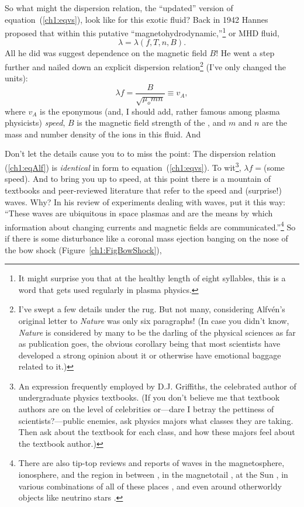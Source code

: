 So what might the dispersion relation, the ``updated'' version of
equation~(\ref{ch1:eqvs}), look like for this exotic fluid? Back in
1942 Hannes \Alf proposed that within this putative
``magnetohydrodynamic,''\footnote{It might surprise you that at the
  healthy length of eight syllables, this is a word that gets used
  regularly in plasma physics.} or MHD fluid,
\begin{equation}
  \label{ch1:eqmhd}
  \lambda = \lambda (f, T, n, B).
\end{equation}
All he did was suggest dependence on the magnetic field $B$! He went a
step further and nailed down an explicit dispersion
relation\footnote{I've swept a few details under the rug. But not
  many, considering Alfv\'{e}n's original letter to \textsl{Nature}
  was only six paragraphs! (In case you didn't know, \textsl{Nature}
  is considered by many to be the darling of the physical sciences as
  far as publication goes, the obvious corollary being that most
  scientists have developed a strong opinion about it or otherwise
  have emotional baggage related to it.)} (I've only changed the
units):
\begin{equation}
  \label{ch1:eqAlf}
  \lambda f = \frac{B}{\sqrt{\mu_o m n}} \equiv v_A,
\end{equation}
where $v_A$ is the eponymous (and, I should add, rather famous among
plasma physicists) \textsl{\Alf speed}, $B$ is the magnetic field
strength of the , and $m$ and $n$ are the mass and number density of
the ions in this fluid. And  

Don't let the details cause you to to miss the point: The dispersion
relation (\ref{ch1:eqAlf}) is \emph{identical} in form to
equation~(\ref{ch1:eqvs}). To wit\footnote{An expression frequently
  employed by D.J. Griffiths, the celebrated author of undergraduate
  physics textbooks. (If you don't believe me that textbook authors
  are on the level of celebrities or---dare I betray the pettiness of
  scientists?---public enemies, ask physics majors what classes they
  are taking. Then ask about the textbook for each class, and how
  these majors feel about the textbook author.)}, $ \lambda f = $(some
speed). And to bring you up to speed, at this point there is a
mountain of textbooks and peer-reviewed literature that refer to the
\Alf speed and (surprise!) \Alf waves. Why? In his review of
experiments dealing with \Alf waves, \cite{Gekelman1999} put it this
way: ``These waves are ubiquitous in space plasmas and are the means
by which information about changing currents and magnetic fields are
communicated.''\footnote{There are also tip-top reviews and reports of
  \Alf waves in the magnetosphere, ionosphere, and the region in
  between \citep{Stasiewicz2000,Berthomier2011,Mottez2015}, in the
  magnetotail \citep{Keiling2009}, at the Sun
  \citep{Mathioudakis2013}, in various combinations of all of these
  places \citep{Wu2016a}, and even around otherworldy objects like
  neutrino stars \citep{Duncan1996}.} So if there is some disturbance
like a coronal mass ejection banging on the nose of the bow shock
(Figure~\ref{ch1:FigBowShock}),

